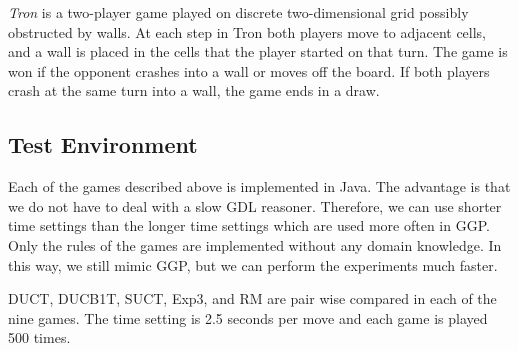 \documentclass[conference]{IEEEtran}
\begin{document}
\textit{Tron} is a two-player game played on discrete two-dimensional grid possibly obstructed by walls. At each
step in Tron both players move to adjacent cells, and a wall is placed in the cells that the player started on that turn. 
The game is won if the opponent crashes into a wall or moves off the board. If both players crash at the same turn 
into a wall, the game ends in a draw.

\subsection{Test Environment}
Each of the games described above is implemented in Java. The advantage is that we do not have to deal with a slow GDL reasoner. Therefore, we can use shorter time settings than the longer time settings which are used more often in GGP. Only the rules of the games are implemented without any domain knowledge. In this way, we still mimic GGP, but we can perform the experiments much faster. 

DUCT, DUCB1T, SUCT, Exp3, and RM are pair wise compared in each of the nine games. The time setting is 2.5 seconds per move and each game is played 500 times.  
\end{document}
